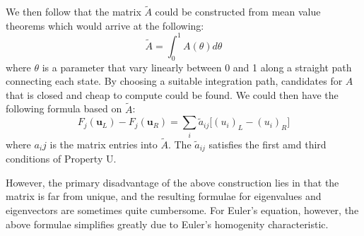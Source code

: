 \documentclass[a4paper]{article}
\numberwithin{equation}{section}
\begin{document}
We then follow that the matrix $\tilde{A}$ could be constructed from mean value theorems which would arrive at the following:
\begin{equation}
    \tilde{A} = \int_0^1 A(\theta) d \theta
\end{equation}
where $\theta$ is a parameter that vary linearly between 0 and 1 along a straight path connecting each state. By choosing a suitable integration path, candidates for $A$ that is closed and cheap to compute could be found. We could then have the following formula based on $\tilde{A}$:
\begin{equation} \label{Roe's Integral}
    F_j(\mathbf{u}_L) - F_j(\mathbf{u}_R) = \sum_i \tilde{a}_{ij} \big[(u_i)_L - (u_i)_R\big]
\end{equation} 
where $a_ij$ is the matrix entries into $\tilde{A}$. The $\tilde{a}_{ij}$ satisfies the first amd third conditions of Property U.

However, the primary disadvantage of the above construction lies in that the matrix is far from unique, and the resulting formulae for eigenvalues and eigenvectors are sometimes quite cumbersome. For Euler's equation, however, the above formulae simplifies greatly due to Euler's homogenity characteristic. 
\end{document}
